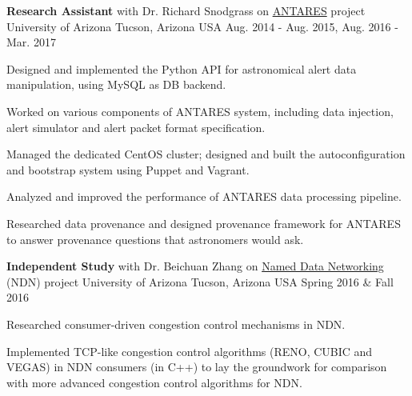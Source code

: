 

\begin{cventries}

  \cventry
    {\textbf{Research Assistant} with Dr. Richard Snodgrass on \href{https://www.noao.edu/ANTARES/}{ANTARES} project} %
    {University of Arizona} %
    {Tucson, Arizona USA} %
    {Aug. 2014 - Aug. 2015, Aug. 2016 - Mar. 2017} %
    {
      \begin{cvitems} %
            \item {Designed and implemented the Python API for astronomical
    alert data manipulation, using MySQL as DB backend.}
      \item {Worked on various components of ANTARES system,
    including data injection, alert simulator and alert packet format specification.}
        \item {Managed the dedicated CentOS cluster; designed and
    built the autoconfiguration and bootstrap 
    system using Puppet and Vagrant.}
        \item {Analyzed and improved the performance of ANTARES data
    processing pipeline.}
    \item {Researched data provenance and designed provenance framework for
    ANTARES to answer provenance questions that astronomers would ask.}
      \end{cvitems}
    }

  \cventry
    {\textbf{Independent Study} with Dr. Beichuan Zhang
    on \href{https://named-data.net/}{Named Data Networking} (NDN) project} %
    {University of Arizona} %
    {Tucson, Arizona USA} %
    {Spring 2016 \& Fall 2016} %
    {
      \begin{cvitems} %
        \item {Researched consumer-driven congestion control mechanisms in NDN.}
        \item {Implemented TCP-like congestion control algorithms (RENO, CUBIC and VEGAS) in NDN
    consumers (in C++) to lay the groundwork for comparison with more
    advanced congestion control algorithms for NDN.}
      \end{cvitems}
    }



\end{cventries}
